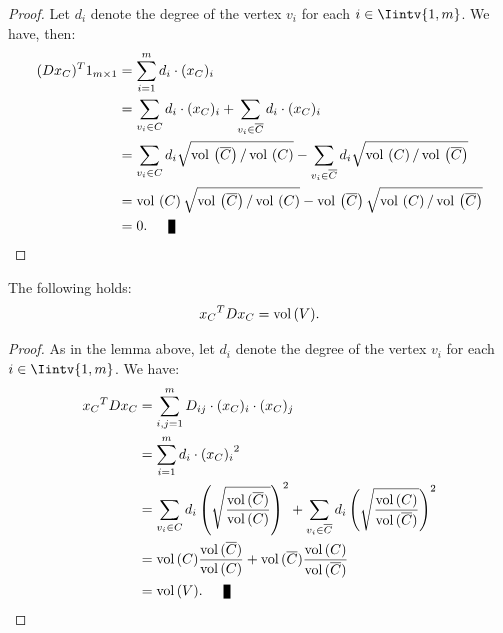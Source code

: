 \begin{proof}
   Let $d_i$ denote the degree of the vertex $v_i$ for each $i \in \Iintv{1,m}$. We have, then:
   \begin{equation*}
      \begin{split}
         (D x_C)^T 1_{m \times 1} &= \sum_{i=1}^m d_i \cdot (x_C)_i \\
         &= \sum_{v_i \in C} d_i \cdot (x_C)_i + \sum_{v_i \in \overline C} d_i \cdot (x_C)_i \\
         &= \sum_{v_i \in C} d_i \sqrt{\vol \left( \overline C \right) / \vol \left( C \right) } - \sum_{v_i \in \overline C} d_i \sqrt{\vol \left( C \right) / \vol \left( \overline C \right) } \\
         &= \vol \left( C \right) \sqrt{\vol \left( \overline C \right) / \vol \left( C \right) } - \vol \left( \overline C \right) \sqrt{\vol \left( C \right) / \vol \left( \overline C \right) } \\
         &= 0. \qed
      \end{split}
   \end{equation*}
\end{proof}

\begin{lemma} \label{cond2}
   The following holds:
   \begin{equation}
      {x_C}^TDx_C = \operatorname*{vol\,} (V).
   \end{equation}
\end{lemma}

\begin{proof}
   As in the lemma above, let $d_i$ denote the degree of the vertex $v_i$ for each $i \in \Iintv{1,m}$. We have:
   \begin{equation*}
      \begin{split}
         {x_C}^T D x_C &= \sum_{i,j=1}^m D_{ij} \cdot (x_C)_i \cdot (x_C)_j \\
         &= \sum_{i=1}^m d_i \cdot {(x_C)_i}^2 \\
         &= \sum_{v_i \in C} d_i \left( \sqrt{\frac{\vol (\overline C)}{\vol (C)}} \right)^2
         + \sum_{v_i \in \overline C} d_i \left( \sqrt{\frac{\vol (C)}{\vol (\overline C)}} \right)^2 \\
         &= \vol(C) \frac{\vol (\overline C)}{\vol(C)} + \vol(\overline C) \frac{\vol (C)}{\vol ( \overline C)} \\
         &= \vol (V). \qed
      \end{split}
   \end{equation*}
\end{proof}

